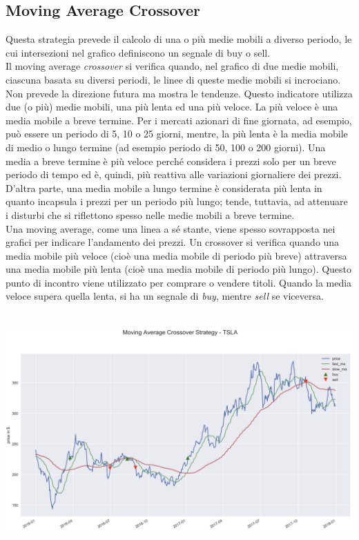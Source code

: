 \documentclass[a4paper,12pt]{report}
\begin{document}
\subsection{Moving Average Crossover}
Questa strategia prevede il calcolo di una o più medie mobili a diverso periodo, le cui intersezioni nel grafico definiscono un segnale di buy o sell.\\
Il moving average \textit{crossover} si verifica quando, nel grafico di due medie mobili, ciascuna basata su diversi periodi, le linee di queste medie mobili si incrociano.\\ Non prevede la direzione futura ma mostra le tendenze. Questo indicatore utilizza due (o più) medie mobili, una più lenta ed una più veloce. La più veloce è una media mobile a breve termine. Per i mercati azionari di fine giornata, ad esempio, può essere un periodo di 5, 10 o 25 giorni, mentre, la più lenta è la media mobile di medio o lungo termine (ad esempio periodo di 50, 100 o 200 giorni). Una media a breve termine è più veloce perché considera i prezzi solo per un breve periodo di tempo ed è, quindi, più reattiva alle variazioni giornaliere dei prezzi. D'altra parte, una media mobile a lungo termine è considerata più lenta in quanto incapsula i prezzi per un periodo più lungo; tende, tuttavia, ad attenuare i disturbi che si riflettono spesso nelle medie mobili a breve termine.
\\
Una moving average, come una linea a sé stante, viene spesso sovrapposta nei grafici per indicare l'andamento dei prezzi. Un crossover si verifica quando una media mobile più veloce (cioè una media mobile di periodo più breve) attraversa una media mobile più lenta (cioè una media mobile di periodo più lungo). Questo punto di incontro viene utilizzato per comprare o vendere titoli. Quando la media veloce supera quella lenta, si ha un segnale di \textit{buy}, mentre \textit{sell} se viceversa.\\~\\
\begin{fig}
	\begin{center}
	\includegraphics[width=\linewidth]{moving_avg}
\label{Figura 2}
	\end{center}
\end{fig}
\end{document}
